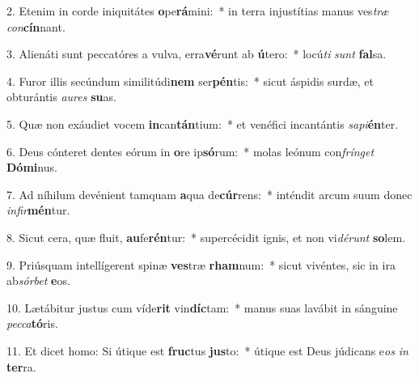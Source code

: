 2. Etenim in corde iniquitátes \textbf{o}pe\textbf{rá}mini:~*  in terra injustítias manus ves\textit{træ} \textit{con}\textbf{cín}nant.\

3. Alienáti sunt peccatóres a vulva, erra\textbf{vé}runt ab \textbf{ú}tero:~*  locú\textit{ti} \textit{sunt} \textbf{fal}sa.\

4. Furor illis secúndum similitúdi\textbf{nem} ser\textbf{pén}tis:~*  sicut áspidis surdæ, et obturántis \textit{au}\textit{res} \textbf{su}as.\

5. Quæ non exáudiet vocem \textbf{in}can\textbf{tán}tium:~*  et venéfici incantántis \textit{sa}\textit{pi}\textbf{én}ter.\

6. Deus cónteret dentes eórum in \textbf{o}re ip\textbf{só}rum:~*  molas leónum con\textit{frín}\textit{get} \textbf{Dó}\textbf{mi}nus.\

7. Ad níhilum devénient tamquam \textbf{a}qua de\textbf{cúr}rens:~*  inténdit arcum suum donec \textit{in}\textit{fir}\textbf{mén}tur.\

8. Sicut cera, quæ fluit, \textbf{au}fe\textbf{rén}tur:~*  supercécidit ignis, et non vi\textit{dé}\textit{runt} \textbf{so}lem.\

9. Priúsquam intellígerent spinæ \textbf{ves}træ \textbf{rham}num:~*  sicut vivéntes, sic in ira ab\textit{sór}\textit{bet} \textbf{e}os.\

10. Lætábitur justus cum víde\textbf{rit} vin\textbf{díc}tam:~*  manus suas lavábit in sánguine \textit{pec}\textit{ca}\textbf{tó}ris.\

11. Et dicet homo: Si útique est \textbf{fruc}tus \textbf{jus}to:~*  útique est Deus júdicans e\textit{os} \textit{in} \textbf{ter}ra.\

